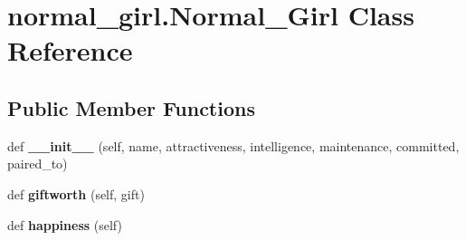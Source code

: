 \hypertarget{classnormal__girl_1_1_normal___girl}{}\section{normal\+\_\+girl.\+Normal\+\_\+\+Girl Class Reference}
\label{classnormal__girl_1_1_normal___girl}
\subsection*{Public Member Functions}
\begin{DoxyCompactItemize}
\item 
\mbox{\label{classnormal__girl_1_1_normal___girl_a8fc16ab0acaf0997b8a4c5e0c2b57a0c}} 
def {\bfseries \+\_\+\+\_\+init\+\_\+\+\_\+} (self, name, attractiveness, intelligence, maintenance, committed, paired\+\_\+to)
\item 
\mbox{\label{classnormal__girl_1_1_normal___girl_ae7d0d26c0cfbf8152fba9113ff9ef763}} 
def {\bfseries giftworth} (self, gift)
\item 
\mbox{\label{classnormal__girl_1_1_normal___girl_a6508d58dab5d0c59d769f3f0c1325b46}} 
def {\bfseries happiness} (self)
\end{DoxyCompactItemize}
